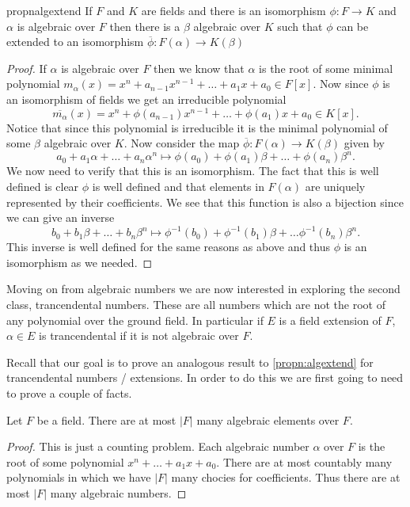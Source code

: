 \begin{restatable}{propn}{algextend}
\label{propn:algextend}
  If $F$ and $K$ are fields and there is an isomorphism $\phi: F \to K$ and
  $\alpha$ is algebraic over $F$ then there is a $\beta$ algebraic over $K$ 
  such that $\phi$ can be extended to an isomorphism $\overline{\phi}:
  F(\alpha) \to K(\beta)$
\end{restatable}
\begin{proof}
   If $\alpha$ is algebraic over $F$ then we know that $\alpha$ is the root of
  some minimal polynomial $m_{\alpha}(x) = x^{n} + a_{n-1}x^{n-1} + \ldots
  + a_1x + a_0 \in F[x]$. Now since $\phi$ is an isomorphism of fields we get
  an irreducible polynomial 
  \[
    \overline{m_{\alpha}}(x) = x^{n} + \phi(a_{n-1})x^{n-1} + \ldots
    + \phi(a_1)x + a_0 \in K[x]
  .\]  
  Notice that since this polynomial is irreducible it is the minimal polynomial
  of some $\beta$ algebraic over $K$. Now consider the map $\overline{\phi}:
  F(\alpha) \to K(\beta)$ given by
  \[
    a_0 + a_1\alpha + \ldots + a_{n}\alpha^{n} \mapsto 
    \phi(a_0) + \phi(a_1)\beta + \ldots + \phi(a_{n})\beta^{n}
  .\] 
  We now need to verify that this is an isomorphism. The fact that this is
  well defined is clear $\phi$ is well defined and that elements in $F(\alpha)$ 
  are uniquely represented by their coefficients. We see that this function is
  also a bijection since we can give an inverse
  \[
    b_0 + b_1\beta + \ldots + b_{n}\beta^{n} \mapsto \phi^{-1}(b_0)
    + \phi^{-1}(b_1)\beta + \ldots \phi^{-1}(b_n)\beta^{n}
  .\] 
  This inverse is well defined for the same reasons as above and thus $\phi$ is
  an isomorphism as we needed.
\end{proof}

Moving on from algebraic numbers we are now interested in exploring the second
class, trancendental numbers.  These are all numbers which are not the root of 
any polynomial over the ground field. In particular if $E$ is a field extension
of $F$, $\alpha \in E$ is trancendental if it is not algebraic over $F$.


Recall that our goal is to prove an analogous result to \cref{propn:algextend}
for trancendental numbers / extensions. In order to do this we are first going
to need to prove a couple of facts. 

\begin{propn}\label{propn:existtrans}
  Let $F$ be a field. There are at most $|F|$ many algebraic elements over $F$.
\end{propn}
\begin{proof}
  This is just a counting problem. Each algebraic number $\alpha$ over $F$ is
  the root of some polynomial $x^{n} + \ldots + a_1x + a_0$. There are at most
  countably many polynomials in which we have $|F|$ many chocies for
  coefficients. Thus there are at most $|F|$ many algebraic numbers.
\end{proof}


